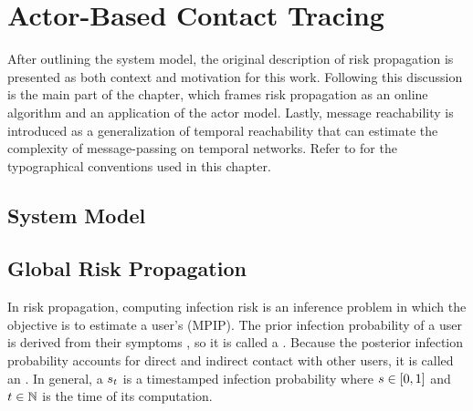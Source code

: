 \chapter{Actor-Based Contact Tracing}

After outlining the system model, the original description of risk propagation is presented as both context and motivation for this work. Following this discussion is the main part of the chapter, which frames risk propagation as an online algorithm and an application of the actor model. Lastly, message reachability is introduced as a generalization of temporal reachability that can estimate the complexity of message-passing on temporal networks. Refer to  for the typographical conventions used in this chapter.

\section{System Model}

\section{Global Risk Propagation}

In risk propagation, computing infection risk is an inference problem in which the objective is to estimate a user's  (MPIP). The prior infection probability of a user is derived from their symptoms \cite{Menni2020}, so it is called a . Because the posterior infection probability accounts for direct and indirect contact with other users\footnotemark{}, it is called an . In general, a  $s_t$ is a timestamped infection probability where $s \in [0, 1]$ and $t \in \mathbb{N}$ is the time of its computation.


